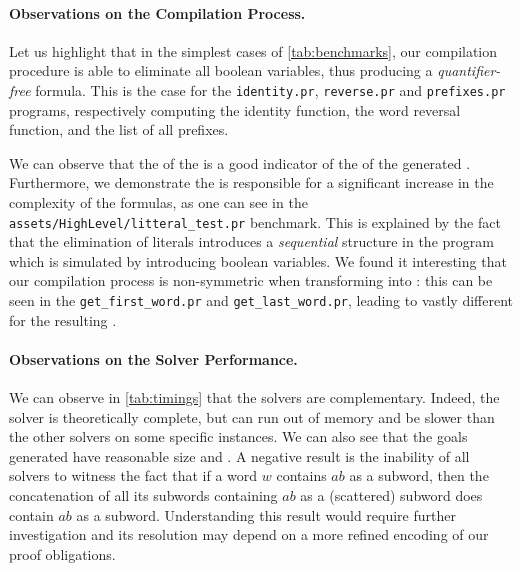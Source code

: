 \paragraph{Observations on the Compilation Process.} Let us highlight that in
the simplest cases of \cref{tab:benchmarks}, our compilation procedure is able
to eliminate all boolean variables, thus producing a \emph{quantifier-free}
formula. This is the case for the \texttt{identity.pr}, \texttt{reverse.pr} and
\texttt{prefixes.pr} programs, respectively computing the identity function,
the word reversal function, and the list of all prefixes.

We can observe that the  of the  is a
good indicator of the  of the generated . Furthermore, we demonstrate the 
is responsible for a significant increase in the complexity of the formulas, as
one can see in the \texttt{assets/HighLevel/litteral\_test.pr} benchmark. This
is explained by the fact that the elimination of literals introduces a
\emph{sequential} structure in the program which is simulated by introducing
boolean variables. We found it interesting that our compilation process is
non-symmetric when transforming  into : this can be seen in the \texttt{get\_first\_word.pr} and
\texttt{get\_last\_word.pr}, leading to vastly different 
for the resulting .

\paragraph{Observations on the Solver Performance.} We can observe in
\cref{tab:timings} that the solvers are complementary. Indeed, the 
solver is theoretically complete, but can run out of memory and be slower than
the other solvers on some specific instances. We can also see that the goals
generated have reasonable size and . A negative result is
the inability of all solvers to witness the fact that if a word $w$ contains
$ab$ as a subword, then the concatenation of all its subwords containing $ab$
as a (scattered) subword does contain $ab$ as a subword. Understanding this
result would require further investigation and its resolution may depend on a
more refined encoding of our proof obligations.
